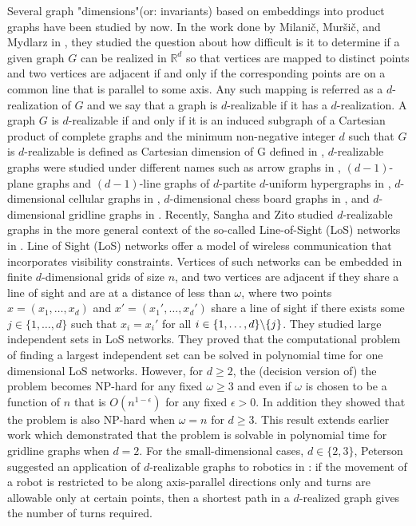 \documentclass[12pt,a4paper,titlepage,openany]{report}
\begin{document}
Several graph "dimensions"(or: invariants) based on embeddings into product graphs have been studied by now. In the work done by Milani\v c, Mur\v si\v c, and Mydlarz in \cite{Milanic}, they studied the question about how difficult is it to determine if a given graph $G$ can be realized in $\mathbb{R}^d$ so that vertices are mapped to distinct points and two vertices are adjacent if and only if the corresponding points are on a common line that is parallel to some axis.
Any such mapping is referred as a $d$-realization of $G$ and we say that a graph is $d$-realizable if it has a $d$-realization. A graph $G$ is $d$-realizable if and only if it is an induced subgraph of a Cartesian product of complete graphs and the minimum non-negative integer $d$ such that $G$ is $d$-realizable is defined as Cartesian dimension of G defined in \cite{Milanic}, $d$-realizable graphs were studied under different names such as arrow graphs in \cite{Cook}, $(d - 1)$-plane graphs and $(d -1)$-line graphs of $d$-partite $d$-uniform hypergraphs in \cite{Bermond}, $d$-dimensional cellular graphs in \cite{Gurvich}, $d$-dimensional chess board graphs in \cite{Staton}, and $d$-dimensional gridline graphs in \cite{Peterson}.\newline
Recently, Sangha and Zito studied $d$-realizable graphs in the more general context of the so-called Line-of-Sight (LoS) networks in \cite{Zito}. Line of Sight (LoS) networks offer a model of wireless communication that incorporates visibility constraints. Vertices of such networks can be embedded in finite $d$-dimensional grids of size $n$, and two vertices are adjacent if they share a line of sight and are at a distance of less than $\omega$, where two points $x=(x_1, \ldots,x_d)$ and $x'=(x_1',\ldots ,x_d')$ share a line of sight if there exists some $j\in \{1,\ldots,d\}$ such that $x_i=x_i'$ for all $i\in \{1,\ldots,d\} \symbol{92} \{j\}$. They studied large independent sets in LoS networks. They proved that the computational problem of finding a largest independent set can be solved in polynomial time for one dimensional LoS networks. However, for $d \geq 2$, the (decision version of) the problem becomes NP-hard for any fixed $\omega \geq 3$ and even if $\omega$ is chosen to be a function of $n$ that is $O(n^{1-\epsilon})$ for any fixed $\epsilon>0$. In addition they showed that the problem is also NP-hard when $\omega = n$ for $d \geq 3$. This result extends earlier work which demonstrated that the problem is solvable in polynomial time for gridline graphs when $d = 2$. For the small-dimensional cases, $d \in \{2, 3\}$, Peterson suggested an application of $d$-realizable graphs to robotics in \cite{Peterson}: if the movement of a robot is restricted to be along axis-parallel directions only and turns are allowable only at certain points, then a shortest path in a $d$-realized graph gives the number of turns required.\newline
\end{document}
